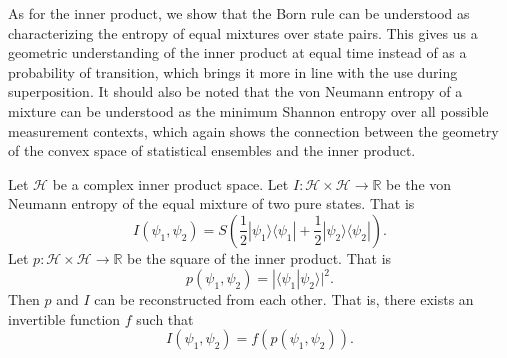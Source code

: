 \documentclass[10pt,twocolumn, nofootinbib]{revtex4-2}
\def\>{\rangle}
\def\<{\langle}
\begin{document}
As for the inner product, we show that the Born rule can be understood as characterizing the entropy of equal mixtures over state pairs. This gives us a geometric understanding of the inner product at equal time instead of as a probability of transition, which brings it more in line with the use during superposition. It should also be noted that the von Neumann entropy of a mixture can be understood as the minimum Shannon entropy over all possible measurement contexts,\cite{nielsen_chuang_2010} which again shows the connection between the geometry of the convex space of statistical ensembles and the inner product.

\begin{prop}\label{prop_innerProductIsEntropy}
Let $\mathcal{H}$ be a complex inner product space. Let $I : \mathcal{H} \times \mathcal{H} \to \mathbb{R}$ be the von Neumann entropy of the equal mixture of two pure states. That is
\begin{equation}
I(\psi_1, \psi_2) = S\left(\frac{1}{2}|\psi_1\>\<\psi_1| + \frac{1}{2}|\psi_2\>\<\psi_2|\right).
\end{equation}
Let $p : \mathcal{H} \times \mathcal{H} \to \mathbb{R}$ be the square of the inner product. That is
\begin{equation}
p(\psi_1, \psi_2) = |\<\psi_1| \psi_2\>|^2.
\end{equation}
Then $p$ and $I$ can be reconstructed from each other. That is, there exists an invertible function $f$ such that
\begin{equation}
I(\psi_1, \psi_2) = f(p(\psi_1, \psi_2)).
\end{equation}
\end{prop}
\end{document}
